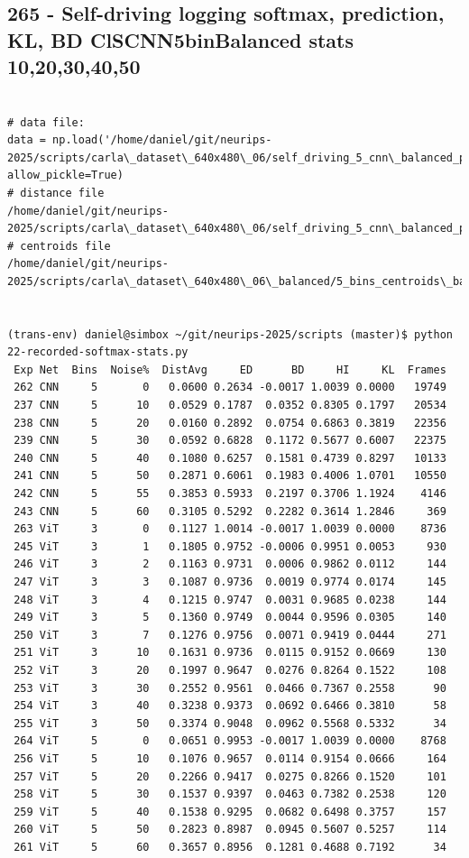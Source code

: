 \subsection{265 - Self-driving logging softmax, prediction, KL, BD ClSCNN5binBalanced stats 10,20,30,40,50}
\label{app_res:265}


\begin{verbatim}

# data file:
data = np.load('/home/daniel/git/neurips-2025/scripts/carla\_dataset\_640x480\_06/self_driving_5_cnn\_balanced_pep_10\_250609_1903.npy', allow_pickle=True)
# distance file
/home/daniel/git/neurips-2025/scripts/carla\_dataset\_640x480\_06/self_driving_5_cnn\_balanced_pep_10\_250609_1903.txt
# centroids file
/home/daniel/git/neurips-2025/scripts/carla\_dataset\_640x480\_06\_balanced/5_bins_centroids\_balanced.npy


(trans-env) daniel@simbox ~/git/neurips-2025/scripts (master)$ python 22-recorded-softmax-stats.py 
 Exp Net  Bins  Noise%  DistAvg     ED      BD     HI     KL  Frames
 262 CNN     5       0   0.0600 0.2634 -0.0017 1.0039 0.0000   19749
 237 CNN     5      10   0.0529 0.1787  0.0352 0.8305 0.1797   20534
 238 CNN     5      20   0.0160 0.2892  0.0754 0.6863 0.3819   22356
 239 CNN     5      30   0.0592 0.6828  0.1172 0.5677 0.6007   22375
 240 CNN     5      40   0.1080 0.6257  0.1581 0.4739 0.8297   10133
 241 CNN     5      50   0.2871 0.6061  0.1983 0.4006 1.0701   10550
 242 CNN     5      55   0.3853 0.5933  0.2197 0.3706 1.1924    4146
 243 CNN     5      60   0.3105 0.5292  0.2282 0.3614 1.2846     369
 263 ViT     3       0   0.1127 1.0014 -0.0017 1.0039 0.0000    8736
 245 ViT     3       1   0.1805 0.9752 -0.0006 0.9951 0.0053     930
 246 ViT     3       2   0.1163 0.9731  0.0006 0.9862 0.0112     144
 247 ViT     3       3   0.1087 0.9736  0.0019 0.9774 0.0174     145
 248 ViT     3       4   0.1215 0.9747  0.0031 0.9685 0.0238     144
 249 ViT     3       5   0.1360 0.9749  0.0044 0.9596 0.0305     140
 250 ViT     3       7   0.1276 0.9756  0.0071 0.9419 0.0444     271
 251 ViT     3      10   0.1631 0.9736  0.0115 0.9152 0.0669     130
 252 ViT     3      20   0.1997 0.9647  0.0276 0.8264 0.1522     108
 253 ViT     3      30   0.2552 0.9561  0.0466 0.7367 0.2558      90
 254 ViT     3      40   0.3238 0.9373  0.0692 0.6466 0.3810      58
 255 ViT     3      50   0.3374 0.9048  0.0962 0.5568 0.5332      34
 264 ViT     5       0   0.0651 0.9953 -0.0017 1.0039 0.0000    8768
 256 ViT     5      10   0.1076 0.9657  0.0114 0.9154 0.0666     164
 257 ViT     5      20   0.2266 0.9417  0.0275 0.8266 0.1520     101
 258 ViT     5      30   0.1537 0.9397  0.0463 0.7382 0.2538     120
 259 ViT     5      40   0.1538 0.9295  0.0682 0.6498 0.3757     157
 260 ViT     5      50   0.2823 0.8987  0.0945 0.5607 0.5257     114
 261 ViT     5      60   0.3657 0.8956  0.1281 0.4688 0.7192      34

\end{verbatim}

